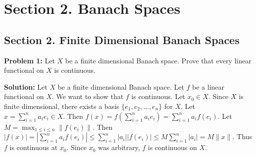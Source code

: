\documentclass{article}
\begin{document}
\section{Section 2. Banach Spaces}
\subsection{Section 2. Finite Dimensional Banach Spaces}

\textbf{Problem 1:} Let $X$ be a finite dimensional Banach space. Prove that every linear functional on $X$ is continuous.  

\textbf{Solution:} Let $X$ be a finite dimensional Banach space. Let $f$ be a linear functional on $X$. We want to show that $f$ is continuous. Let $x_0 \in X$. Since $X$ is finite dimensional, there exists a basis $\{e_1, e_2, \ldots, e_n\}$ for $X$. Let $x = \sum_{i=1}^n a_i e_i \in X$. Then $f(x) = f(\sum_{i=1}^n a_i e_i) = \sum_{i=1}^n a_i f(e_i)$. Let $M = \max_{1 \leq i \leq n} \|f(e_i)\|$. Then $|f(x)| = |\sum_{i=1}^n a_i f(e_i)| \leq \sum_{i=1}^n |a_i| |f(e_i)| \leq M \sum_{i=1}^n |a_i| = M \|x\|$. Thus $f$ is continuous at $x_0$. Since $x_0$ was arbitrary, $f$ is continuous on $X$.
\end{document}
